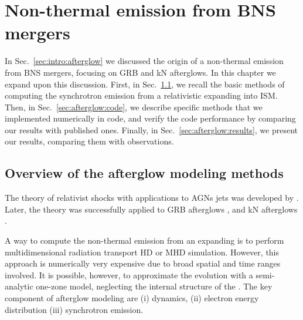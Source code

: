 
\chapter{Non-thermal emission from \ac{BNS} mergers} \label{ch:afterglow} 


In Sec.~\ref{sec:intro:afterglow} we discussed the origin of 
a non-thermal emission from \ac{BNS} mergers, focusing on 
\ac{GRB} and \ac{kN} afterglows. 
%
In this chapter we expand upon this discussion. First, in 
Sec.~\ref{sec:intro:afterglow_modelling}, we recall the basic methods 
of computing the synchrotron emission from a relativistic \blast{} 
expanding into \ac{ISM}. 
%
Then, in Sec.~\ref{sec:afterglow:code}, we describe specific methods 
that we implemented numerically in \pyblast{} code, and verify the 
code performance by comparing our results with published ones. 
%
Finally, in Sec.~\ref{sec:afterglow:results}, we present our results, 
comparing them with observations. 



\section{Overview of the afterglow modeling methods}\label{sec:intro:afterglow_modelling}

The theory of relativist shocks with applications to \acp{AGN} jets was 
developed by \citet{Blandford:1976}. Later, the theory was successfully 
applied to \ac{GRB} afterglows \citep{Costa:1997cg,vanParadijs:1997wr,Frail:1997qf},
and \ac{kN} afterglows \citep[\eg][]{Nakar:2011cw,Hotokezaka:2015eja,Hotokezaka:2018gmo}.

A way to compute the non-thermal emission from an expanding \blast{} 
is to perform multidimensional 
radiation transport \ac{HD} or \ac{MHD} simulation. However, this 
approach is numerically very expensive due to broad spatial and 
time ranges involved. 
%
It is possible, however, to approximate the \blast{} evolution  
with a semi-analytic one-zone model, neglecting the internal structure 
of the \blast{} \citep{Nava:2013,Peer:2012,Kumar:2014upa}. 
%
The key component of afterglow modeling are (i) \blast{} dynamics, 
(ii) electron energy distribution (iii) synchrotron emission. 



